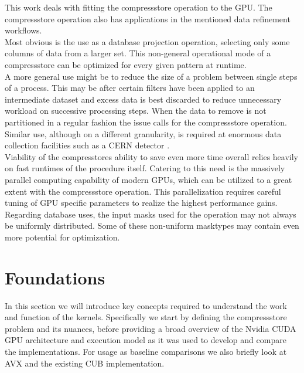\documentclass{tudscrreprt}
\begin{document}
		This work deals with fitting the compressstore operation to the GPU. The compressstore operation also has applications in the mentioned data refinement workflows. \\
		Most obvious is the use as a database projection operation, selecting only some columns of data from a larger set. This non-general operational mode of a compressstore can be optimized for every given pattern at runtime. \\
		A more general use might be to reduce the size of a problem between single steps of a process. This may be after certain filters have been applied to an intermediate dataset and excess data is best discarded to reduce unnecessary workload on successive processing steps. When the data to remove is not partitioned in a regular fashion the issue calls for the compressstore operation. \\
		Similar use, although on a different granularity, is required at enormous data collection facilities such as a CERN detector \cite{cern_datastreaming}. \\
		
		Viability of the compresstores ability to save even more time overall relies heavily on fast runtimes of the procedure itself. Catering to this need is the massively parallel computing capability of modern GPUs, which can be utilized to a great extent with the compressstore operation. This parallelization requires careful tuning of GPU specific parameters to realize the highest performance gains. \\
		
		Regarding database uses, the input masks used for the operation may not always be uniformly distributed. Some of these non-uniform masktypes may contain even more potential for optimization. \\
		
	\chapter{Foundations}
		In this section we will introduce key concepts required to understand the work and function of the kernels. Specifically we start by defining the compressstore problem and its nuances, before providing a broad overview of the Nvidia CUDA GPU architecture and execution model as it was used to develop and compare the implementations. For usage as baseline comparisons we also briefly look at AVX and the existing CUB implementation.
	
\end{document}
